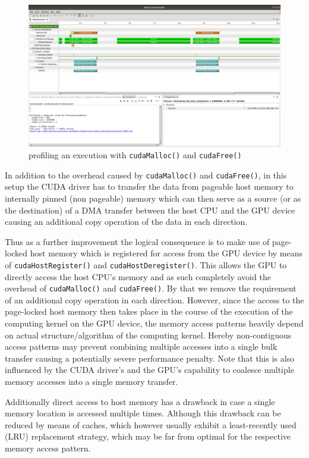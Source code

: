 \begin{figure}
    \centering
    \includegraphics[width=0.8\linewidth]{Figures/memory_malloc}
    \caption{profiling an execution with \texttt{cudaMalloc()} and \texttt{cudaFree()} \label{fig:memory_malloc}}
\end{figure}

In addition to the overhead caused by \texttt{cudaMalloc()} and \texttt{cudaFree()}, in this setup the CUDA driver has to transfer the data from pageable host memory to internally pinned (non pageable) memory which can then serve as a source (or as the destination) of a DMA transfer between the host CPU and the GPU device causing an additional copy operation of the data in each direction.

Thus as a further improvement the logical consequence is to make use of page-locked host memory which is registered for access from the GPU device by means of \texttt{cudaHostRegister()} and \texttt{cudaHostDeregister()}. This allows the GPU to directly access the host CPU's memory and as such completely avoid the overhead of \texttt{cudaMalloc()} and \texttt{cudaFree()}. By that we remove the requirement of an additional copy operation in each direction. However, since the access to the page-locked host memory then takes place in the course of the execution of the computing kernel on the GPU device, the memory access patterns heavily depend on actual structure/algorithm of the computing kernel. Hereby non-contiguous access patterns may prevent combining multiple accesses into a single bulk transfer causing a potentially severe performance penalty. Note that this is also influenced by the CUDA driver's and the GPU's capability to coalesce multiple memory accesses into a single memory transfer. 

Additionally direct access to host memory has a drawback in case a single memory location is accessed multiple times. Although this drawback can be reduced by means of caches, which however usually exhibit a least-recently used (LRU) replacement strategy, which may be far from optimal for the respective memory access pattern.

